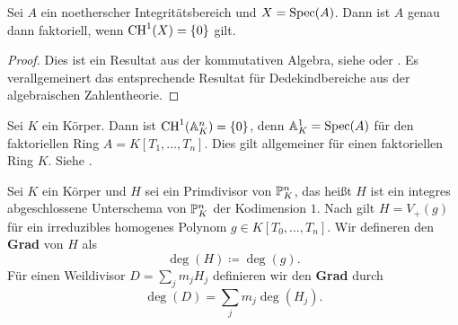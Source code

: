 \begin{prop}
\label{prop:12.14}
	Sei $A$ ein noetherscher Integritätsbereich und $X=\Spec(A)$. Dann ist $A$ genau dann faktoriell, wenn $\CH^1(X)=\{0\}$ gilt.
	\begin{proof}
		Dies ist ein Resultat aus der kommutativen Algebra, siehe \cite[Chapter~7, §3]{bourbaki1998commutative} oder \cite[Proposition~II.6.2]{hartshorne1977algebraic}. Es verallgemeinert das entsprechende Resultat für Dedekindbereiche aus der algebraischen Zahlentheorie.
	\end{proof}
\end{prop}

\begin{bsp}
\label{bsp:12.15}
	Sei $K$ ein Körper. Dann ist $\CH^1(\A_K^n) = \{0\}$, denn $\A^1_K=\Spec(A)$ für den faktoriellen Ring $A=K[T_1,\ldots,T_n]$. Dies gilt allgemeiner für einen faktoriellen Ring $K$. Siehe \cite[Appendix~A]{gubler2014vorlesungsskript}.
\end{bsp}

\begin{defn}
\label{defn:12.16}
	Sei $K$ ein Körper und $H$ sei ein Primdivisor von $\P^n_K$, das heißt $H$ ist ein integres abgeschlossene Unterschema von $\P^n_K$ der Kodimension $1$. Nach \cite[Corollary~5.4.2]{goertz2010algebraic} gilt $H=V_+(g)$ für ein irreduzibles homogenes Polynom $g\in K[T_0,\ldots,T_n]$. Wir defineren den \textbf{Grad} von $H$ als
	\[
		\deg(H) \coloneqq \deg(g).
	\]
	Für einen Weildivisor $D = \sum_{j}m_jH_j$ definieren wir den \textbf{Grad} durch
	\[
		\deg(D) = \sum_{j}m_j\deg(H_j).
	\]
\end{defn}

